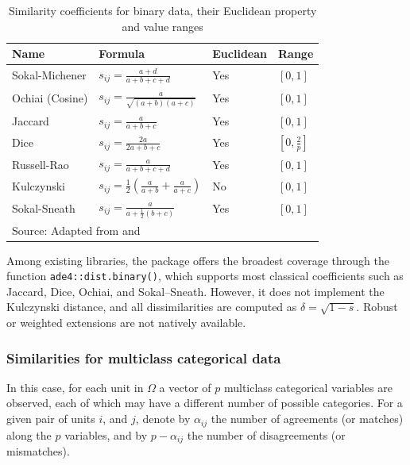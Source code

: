\begin{table}[h!]
\begin{center}
\caption{Similarity coefficients for binary data, their Euclidean property and value ranges}
\label{tab.dist.binary}
{\footnotesize
\begin{tabular}{|p{2.5cm}p{3.5cm}p{1.5cm}p{1.5cm}|}
\hline
\textbf{Name} & \textbf{Formula} & \textbf{Euclidean} & \textbf{Range} \\
\hline
Sokal-Michener & 
$\displaystyle s_{ij} = \frac{a + d}{a + b + c + d} $  & Yes & $[0,1]$ \\
\hline
Ochiai (Cosine) & 
$\displaystyle s_{ij} = \frac{a}{\sqrt{(a + b)(a + c)}} $  & Yes & $[0,1]$ \\
\hline
Jaccard & 
$\displaystyle s_{ij} = \frac{a}{a + b + c} $ & Yes & $[0,1]$ \\
\hline
Dice & 
$\displaystyle s_{ij} = \frac{2a}{2a + b + c} $ & Yes & $[0,\frac{2}{p}]$ \\
\hline
Russell-Rao & 
$\displaystyle s_{ij} = \frac{a}{a + b + c + d} $ & Yes & $[0,1]$ \\
\hline
Kulczynski & 
$\displaystyle s_{ij} = \frac{1}{2} \left( \frac{a}{a + b} + \frac{a}{a + c} \right) $ & No & $[0,1]$ \\
\hline
Sokal-Sneath & 
$\displaystyle s_{ij} = \frac{a}{a + \frac{1}{2} (b + c)} $ & Yes & $[0,1]$ \\
\hline
\multicolumn{4}{l}{Source: Adapted from \cite{gower1986metric} and \cite{CUADRAS1989459}}
\end{tabular}}
\end{center}
\end{table}

Among existing libraries, the  package offers the broadest coverage through the function \texttt{ade4::dist.binary()}, which supports most classical coefficients such as Jaccard, Dice, Ochiai, and Sokal–Sneath. However, it does not implement the Kulczynski distance, and all dissimilarities are computed as $\delta = \sqrt{1 - s}$. Robust or weighted extensions are not natively available.

\subsubsection{Similarities for multiclass categorical data}

In this case, for each unit in $\Omega$ a vector of $p$ multiclass categorical variables are observed, each of which may have a different number of possible categories. For a given pair of units $i$, and $j$, denote by $\alpha_{ij}$ the number of agreements (or matches) along the $p$ variables, and by $p-\alpha_{ij}$ the number of disagreements (or mismatches).

